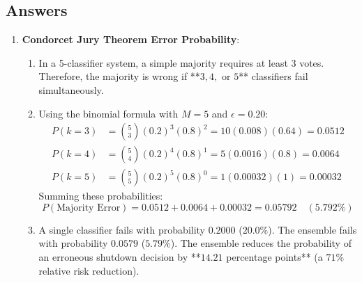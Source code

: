 \subsection*{Answers}

\begin{enumerate}
    \item \textbf{Condorcet Jury Theorem Error Probability}:
    \begin{enumerate}[label=(\alph*)]
        \item In a 5-classifier system, a simple majority requires at least $3$ votes. Therefore, the majority is wrong if **$3, 4, \text{ or } 5$** classifiers fail simultaneously.
        \item Using the binomial formula with $M = 5$ and $\epsilon = 0.20$:
        \begin{align*}
        P(k = 3) &= \binom{5}{3} (0.2)^3 (0.8)^2 = 10(0.008)(0.64) = 0.0512 \\
        P(k = 4) &= \binom{5}{4} (0.2)^4 (0.8)^1 = 5(0.0016)(0.8) = 0.0064 \\
        P(k = 5) &= \binom{5}{5} (0.2)^5 (0.8)^0 = 1(0.00032)(1) = 0.00032
        \end{align*}
        Summing these probabilities:
        \begin{equation*}
        P(\text{Majority Error}) = 0.0512 + 0.0064 + 0.00032 = \mathbf{0.05792} \quad (\mathbf{5.792\%})
        \end{equation*}
        \item A single classifier fails with probability $0.2000$ ($20.0\%$). The ensemble fails with probability $0.0579$ ($5.79\%$). 
        The ensemble reduces the probability of an erroneous shutdown decision by **$14.21$ percentage points** (a $71\%$ relative risk reduction).
    \end{enumerate}


\end{enumerate}
